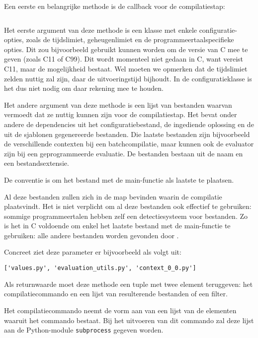 Een eerste en belangrijke methode is de callback voor de compilatiestap:

\inputminted[firstline=12,lastline=17,gobble=4]{python}{sources/c-config.py}

Het eerste argument van deze methode is een klasse met enkele configuratie-opties, zoals de tijdslimiet, geheugenlimiet en de programmeertaalspecifieke opties.
Dit zou bijvoorbeeld gebruikt kunnen worden om de versie van C mee te geven (zoals C11 of C99).
Dit wordt momenteel niet gedaan in C, want \tested{} vereist C11, maar de mogelijkheid bestaat.
Wel moeten we opmerken dat de tijdslimiet zelden nuttig zal zijn, daar \tested{} de uitvoeringstijd bijhoudt.
In de configuratieklasse is het dus niet nodig om daar rekening mee te houden.

Het andere argument van deze methode is een lijst van bestanden waarvan \tested{} vermoedt dat ze nuttig kunnen zijn voor de compilatiestap.
Het bevat onder andere de dependencies uit het configuratiebestand, de ingediende oplossing en de uit de sjablonen gegenereerde bestanden.
Die laatste bestanden zijn bijvoorbeeld de verschillende contexten bij een batchcompilatie, maar kunnen ook de evaluator zijn bij een geprogrammeerde evaluatie.
De bestanden bestaan uit de naam en een bestandsextensie.

De conventie is om het bestand met de main-functie als laatste te plaatsen.

Al deze bestanden zullen zich in de map bevinden waarin de compilatie plaatsvindt.
Het is niet verplicht om al deze bestanden ook effectief te gebruiken: sommige programmeertalen hebben zelf een detectiesysteem voor bestanden.
Zo is het in C voldoende om enkel het laatste bestand met de main-functie te gebruiken: alle andere bestanden worden gevonden door .

Concreet ziet deze parameter er bijvoorbeeld als volgt uit:

\begin{verbatim}
['values.py', 'evaluation_utils.py', 'context_0_0.py']
\end{verbatim}

Als returnwaarde moet deze methode een tuple met twee element teruggeven: het compilatiecommando en een lijst van resulterende bestanden of een filter.

Het compilatiecommando neemt de vorm aan van een lijst van de elementen waaruit het commando bestaat.
Bij het uitvoeren van dit commando zal deze lijst aan de Python-module \texttt{subprocess} gegeven worden.

